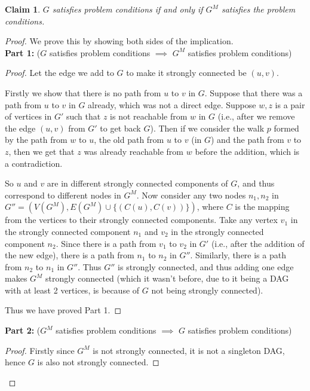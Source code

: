 \documentclass[answers]{exam}
\newtheorem*{claim}{Claim}
\begin{document}
\begin{questions}
\begin{parts}
\begin{solution}
\begin{claim}$G$ satisfies problem conditions if and only if $G^M$ satisfies the problem conditions.\end{claim}

\begin{proof} We prove this by showing both sides of the implication.\\

\textbf{Part 1:} ($G$ satisfies problem conditions $\implies$ $G^M$ satisfies problem conditions)

\begin{proof}
Let the edge we add to $G$ to make it strongly connected be $(u, v)$.

Firstly we show that there is no path from $u$ to $v$ in $G$. Suppose that there was a path from $u$ to $v$ in $G$ already, which was not a direct edge. Suppose $w, z$ is a pair of vertices in $G'$ such that $z$ is not reachable from $w$ in $G$ (i.e., after we remove the edge $(u, v)$ from $G'$ to get back $G$). Then if we consider the walk $p$ formed by the path from $w$ to $u$, the old path from $u$ to $v$ (in $G$) and the path from $v$ to $z$, then we get that $z$ was already reachable from $w$ before the addition, which is a contradiction.

So $u$ and $v$ are in different strongly connected components of $G$, and thus correspond to different nodes in $G^M$. Now consider any two nodes $n_1, n_2$ in $G'' = (V(G^M), E(G^M) \cup \{(C(u), C(v))\})$, where $C$ is the mapping from the vertices to their strongly connected components. Take any vertex $v_1$ in the strongly connected component $n_1$ and $v_2$ in the strongly connected component $n_2$. Since there is a path from $v_1$ to $v_2$ in $G'$ (i.e., after the addition of the new edge), there is a path from $n_1$ to $n_2$ in $G''$. Similarly, there is a path from $n_2$ to $n_1$ in $G''$. Thus $G''$ is strongly connected, and thus adding one edge makes $G^M$ strongly connected (which it wasn't before, due to it being a DAG with at least 2 vertices, is because of $G$ not being strongly connected).

Thus we have proved Part 1.
\end{proof}

\textbf{Part 2:} ($G^M$ satisfies problem conditions $\implies$ $G$ satisfies problem conditions)

\begin{proof}
Firstly since $G^M$ is not strongly connected, it is not a singleton DAG, hence $G$ is also not strongly connected.


\end{proof}
\end{proof}
\end{solution}
\end{parts}
\end{questions}
\end{document}
